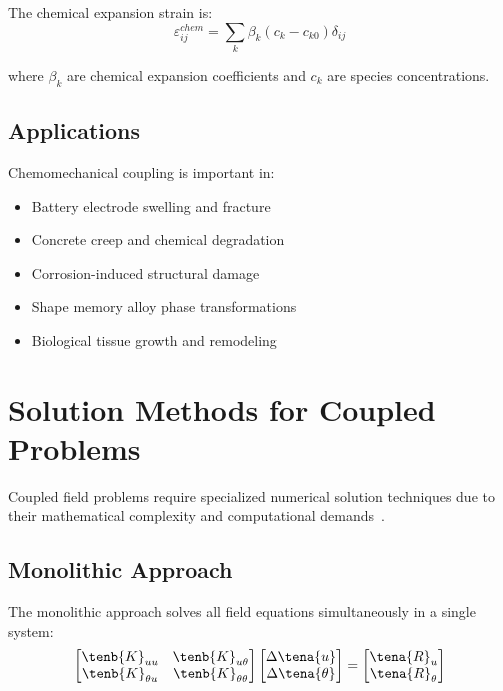 The chemical expansion strain is:
\begin{equation}
\varepsilon_{ij}^{chem} = \sum_k \beta_k (c_k - c_{k0}) \delta_{ij}
\end{equation}

where $\beta_k$ are chemical expansion coefficients and $c_k$ are species concentrations.

\subsection{Applications}

Chemomechanical coupling is important in:
\begin{itemize}
\item Battery electrode swelling and fracture
\item Concrete creep and chemical degradation
\item Corrosion-induced structural damage
\item Shape memory alloy phase transformations
\item Biological tissue growth and remodeling
\end{itemize}

\section{Solution Methods for Coupled Problems}

Coupled field problems require specialized numerical solution techniques due to their mathematical complexity and computational demands~\autocite{Sadd.2019}.

\subsection{Monolithic Approach}

The monolithic approach solves all field equations simultaneously in a single system:
\begin{equation}
\begin{bmatrix}
\tenb{K}_{uu} & \tenb{K}_{u\theta} \\
\tenb{K}_{\theta u} & \tenb{K}_{\theta\theta}
\end{bmatrix}
\begin{bmatrix}
\Delta \tena{u} \\
\Delta \tena{\theta}
\end{bmatrix}
=
\begin{bmatrix}
\tena{R}_u \\
\tena{R}_\theta
\end{bmatrix}
\end{equation}

